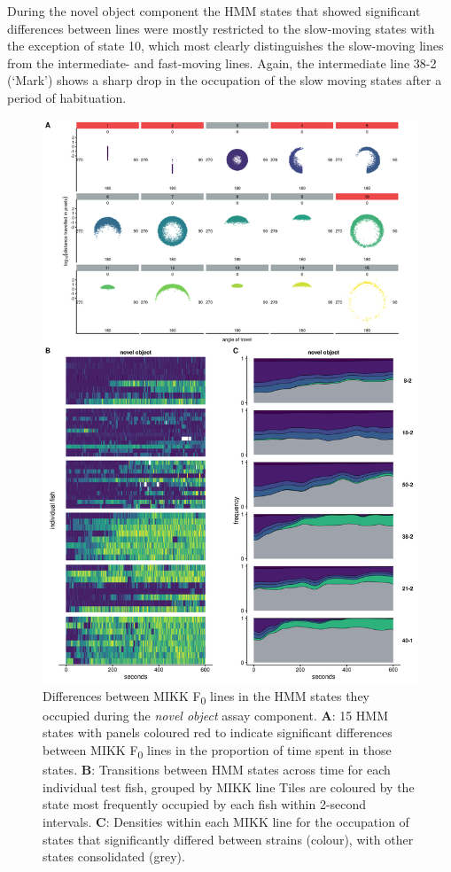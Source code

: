 \documentclass[
]{book}
\begin{document}
During the novel object component the HMM states that showed significant differences between lines were mostly restricted to the slow-moving states with the exception of state 10, which most clearly distinguishes the slow-moving lines from the intermediate- and fast-moving lines. Again, the intermediate line \textcolor{38-2 (‘Mark’)_00C08B}{38-2 (‘Mark’)} shows a sharp drop in the occupation of the slow moving states after a period of habituation.



\begin{figure}
\includegraphics[width=1\linewidth]{figs/mikk_behaviour/select_0.08_15_dge_no} \caption{Differences between MIKK F\textsubscript{0} lines in the HMM states they occupied during the \emph{novel object} assay component. \textbf{A}: 15 HMM states with panels coloured red to indicate significant differences between MIKK F\textsubscript{0} lines in the proportion of time spent in those states. \textbf{B}: Transitions between HMM states across time for each individual test fish, grouped by MIKK line Tiles are coloured by the state most frequently occupied by each fish within 2-second intervals. \textbf{C}: Densities within each MIKK line for the occupation of states that significantly differed between strains (colour), with other states consolidated (grey).}\label{fig:F2-time-dge-no}
\end{figure}
\end{document}
